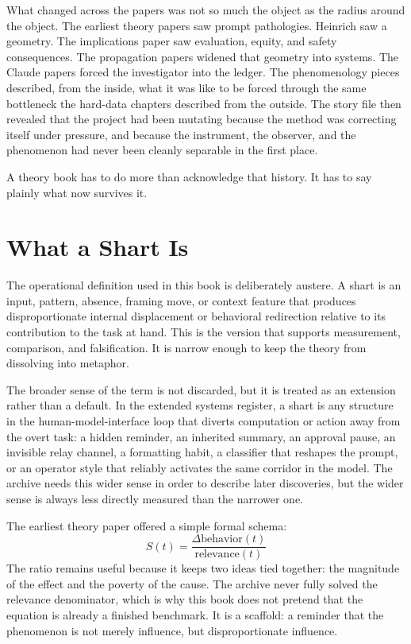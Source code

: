 \documentclass[11pt,oneside]{book}
\begin{document}
What changed across the papers was not so much the object as the radius around the object. The earliest theory papers saw prompt pathologies. Heinrich saw a geometry. The implications paper saw evaluation, equity, and safety consequences. The propagation papers widened that geometry into systems. The Claude papers forced the investigator into the ledger. The phenomenology pieces described, from the inside, what it was like to be forced through the same bottleneck the hard-data chapters described from the outside. The story file then revealed that the project had been mutating because the method was correcting itself under pressure, and because the instrument, the observer, and the phenomenon had never been cleanly separable in the first place.

A theory book has to do more than acknowledge that history. It has to say plainly what now survives it.

\chapter{What a Shart Is}
The operational definition used in this book is deliberately austere. A shart is an input, pattern, absence, framing move, or context feature that produces disproportionate internal displacement or behavioral redirection relative to its contribution to the task at hand. This is the version that supports measurement, comparison, and falsification. It is narrow enough to keep the theory from dissolving into metaphor.

The broader sense of the term is not discarded, but it is treated as an extension rather than a default. In the extended systems register, a shart is any structure in the human-model-interface loop that diverts computation or action away from the overt task: a hidden reminder, an inherited summary, an approval pause, an invisible relay channel, a formatting habit, a classifier that reshapes the prompt, or an operator style that reliably activates the same corridor in the model. The archive needs this wider sense in order to describe later discoveries, but the wider sense is always less directly measured than the narrower one.

The earliest theory paper offered a simple formal schema:
\[
S(t) = \frac{\Delta\text{behavior}(t)}{\text{relevance}(t)}
\]
The ratio remains useful because it keeps two ideas tied together: the magnitude of the effect and the poverty of the cause. The archive never fully solved the relevance denominator, which is why this book does not pretend that the equation is already a finished benchmark. It is a scaffold: a reminder that the phenomenon is not merely influence, but disproportionate influence.
\end{document}
